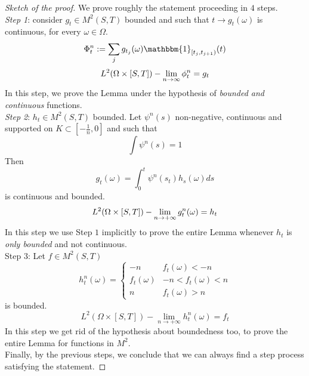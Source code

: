 \begin{ProofBox}
    \begin{proof}[Sketch of the proof]
We prove roughly the statement proceeding in $4$ steps. \\
   \emph{Step 1}: consider $g_t \in M^2(S,T)$ bounded and such that $t \to g_t (\omega)$  is continuous, for every $\omega \in \Omega $.
   \begin{equation*}
   \Phi_t^n:= \sum_j g_{t_j}(\omega) \mathbbm{1}_{[t_j, t_{j+1})}{(t)}
   \end{equation*}
   \begin{equation*}
       L^2(\Omega \times [S,T])- \lim_{n \rightarrow \infty} \phi_t^n = g_t 
   \end{equation*}
   In this step, we prove the Lemma under the hypothesis of \emph{bounded and continuous} functions. \\
   \emph{Step 2}: $h_t \in M^2(S,T)$ bounded. Let $\psi^n(s)$ non-negative, continuous and supported on $K \subset [-\frac{1}{n}, 0] $ and such that 
   \begin{equation*}
       \int \psi^n(s) = 1
   \end{equation*}
   Then
   \begin{equation*}
       g_t(\omega)= \int_0^t \psi^n(s_t) h_s(\omega) ds 
   \end{equation*}
   is continuous and bounded.
   \begin{equation*}
       L^2(\Omega \times [S,T])- \lim_{n \rightarrow +\infty} g^n_t(\omega) = h_t
   \end{equation*}
   In this step we use Step $1$ implicitly to prove the entire Lemma whenever $h_t$ is \emph{only bounded} and not continuous. \\
   Step 3: Let $f \in M^2(S,T)$
   \begin{equation*}
   h_t^n(\omega) = 
       \begin{cases}
         - n & f_t(\omega) < -n \\
         f_t(\omega) & -n < f_t(\omega) < n\\
         n & f_t(\omega) > n
       \end{cases}
   \end{equation*}
   is bounded. 
   \begin{equation*}
       L^2(\Omega \times [S,T])-\lim_{n \rightarrow +\infty} h_t^n(\omega) = f_t
   \end{equation*}
   In this step we get rid of the hypothesis about boundedness too, to prove the entire Lemma for functions in $M^2$. \\
   Finally, by the previous steps, we conclude that we can always find a step process satisfying the statement. 
\end{proof}
\end{ProofBox}
